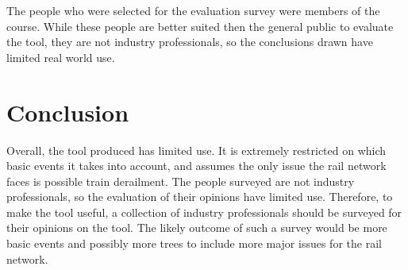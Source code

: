 \documentclass[11pt,a4]{article}
\begin{document}
The people who were selected for the evaluation survey were members of the course.
While these people are better suited then the general public to evaluate the tool, they
are not industry professionals, so the conclusions drawn have limited real world use.

\section{Conclusion}
Overall, the tool produced has limited use.
It is extremely restricted on which basic events it takes into account, and assumes the
only issue the rail network faces is possible train derailment.
The people surveyed are not industry professionals, so the evaluation of their opinions
have limited use.
Therefore, to make the tool useful, a collection of industry professionals should be
surveyed for their opinions on the tool.
The likely outcome of such a survey would be more basic events and possibly more trees
to include more major issues for the rail network.
\end{document}
